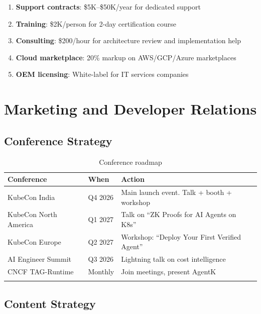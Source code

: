 \documentclass[12pt,a4paper,openany]{report}
\begin{document}
\begin{enumerate}
    \item \textbf{Support contracts}: \$5K--\$50K/year for dedicated support
    \item \textbf{Training}: \$2K/person for 2-day certification course
    \item \textbf{Consulting}: \$200/hour for architecture review and implementation help
    \item \textbf{Cloud marketplace}: 20\% markup on AWS/GCP/Azure marketplaces
    \item \textbf{OEM licensing}: White-label for IT services companies
\end{enumerate}


\chapter{Marketing and Developer Relations}

\section{Conference Strategy}

\begin{longtable}{p{4cm}p{3cm}p{6cm}}
\toprule
\textbf{Conference} & \textbf{When} & \textbf{Action} \\
\midrule
KubeCon India & Q4 2026 & Main launch event. Talk + booth + workshop \\
KubeCon North America & Q1 2027 & Talk on ``ZK Proofs for AI Agents on K8s'' \\
KubeCon Europe & Q2 2027 & Workshop: ``Deploy Your First Verified Agent'' \\
AI Engineer Summit & Q3 2026 & Lightning talk on cost intelligence \\
CNCF TAG-Runtime & Monthly & Join meetings, present AgentK \\
\bottomrule
\caption{Conference roadmap}
\end{longtable}

\section{Content Strategy}
\end{document}
